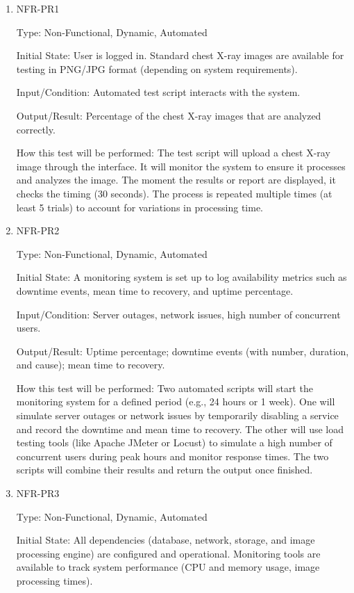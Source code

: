 \documentclass[12pt, titlepage]{article}
\begin{document}
\begin{enumerate}
\begin{enumerate}
  \item{NFR-PR1\\}\label{NFR-PR1}
  
  Type: Non-Functional, Dynamic, Automated
  
  Initial State: User is logged in. Standard chest X-ray images are available for testing in PNG/JPG format (depending on system requirements).
  
  Input/Condition: Automated test script interacts with the system.
  
  Output/Result: Percentage of the chest X-ray images that are analyzed correctly.
  
  How this test will be performed: The test script will upload a chest X-ray image through the interface. It will monitor the system to ensure it processes and analyzes the image. The moment the results or report are displayed, it checks the timing (30 seconds). The process is repeated multiple times (at least 5 trials) to account for variations in processing time.
  
  \item{NFR-PR2\\}\label{NFR-PR2}
  
  Type: Non-Functional, Dynamic, Automated
  
  Initial State: A monitoring system is set up to log availability metrics such as downtime events, mean time to recovery, and uptime percentage.
  
  Input/Condition: Server outages, network issues, high number of concurrent users.
  
  Output/Result: Uptime percentage; downtime events (with number, duration, and cause); mean time to recovery.
  
  How this test will be performed: Two automated scripts will start the monitoring system for a defined period (e.g., 24 hours or 1 week). One will simulate server outages or network issues by temporarily disabling a service and record the downtime and mean time to recovery. The other will use load testing tools (like Apache JMeter or Locust) to simulate a high number of concurrent users during peak hours and monitor response times. The two scripts will combine their results and return the output once finished.
  
  \item{NFR-PR3\\}\label{NFR-PR3}
  
  Type: Non-Functional, Dynamic, Automated
  
  Initial State: All dependencies (database, network, storage, and image processing engine) are configured and operational. Monitoring tools are available to track system performance (CPU and memory usage, image processing times).
  

\end{enumerate}
\end{enumerate}
\end{document}
